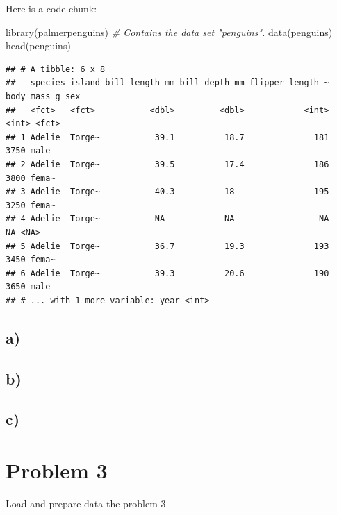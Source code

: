 \documentclass[
]{article}
\newenvironment{Shaded}{\begin{snugshade}}{\end{snugshade}}
\newcommand{\CommentTok}[1]{\textcolor[rgb]{0.56,0.35,0.01}{\textit{#1}}}
\newcommand{\FunctionTok}[1]{\textcolor[rgb]{0.00,0.00,0.00}{#1}}
\newcommand{\NormalTok}[1]{#1}
\begin{document}
Here is a code chunk:

\begin{Shaded}
\begin{Highlighting}[]
\FunctionTok{library}\NormalTok{(palmerpenguins) }\CommentTok{\# Contains the data set "penguins".}
\FunctionTok{data}\NormalTok{(penguins)}
\FunctionTok{head}\NormalTok{(penguins)}
\end{Highlighting}
\end{Shaded}

\begin{verbatim}
## # A tibble: 6 x 8
##   species island bill_length_mm bill_depth_mm flipper_length_~ body_mass_g sex  
##   <fct>   <fct>           <dbl>         <dbl>            <int>       <int> <fct>
## 1 Adelie  Torge~           39.1          18.7              181        3750 male 
## 2 Adelie  Torge~           39.5          17.4              186        3800 fema~
## 3 Adelie  Torge~           40.3          18                195        3250 fema~
## 4 Adelie  Torge~           NA            NA                 NA          NA <NA> 
## 5 Adelie  Torge~           36.7          19.3              193        3450 fema~
## 6 Adelie  Torge~           39.3          20.6              190        3650 male 
## # ... with 1 more variable: year <int>
\end{verbatim}

\hypertarget{a-1}{%
\subsection{a)}\label{a-1}}

\hypertarget{b-1}{%
\subsection{b)}\label{b-1}}

\hypertarget{c-1}{%
\subsection{c)}\label{c-1}}

\hypertarget{problem-3}{%
\section{Problem 3}\label{problem-3}}

Load and prepare data the problem 3
\end{document}
